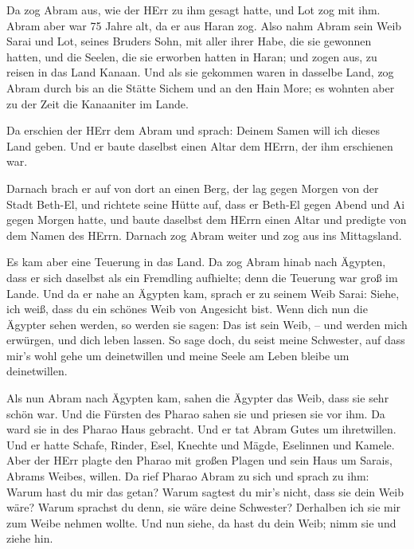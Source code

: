  Da zog Abram aus, wie der HErr zu ihm gesagt hatte, und Lot
zog mit ihm. Abram aber war 75 Jahre alt, da er aus Haran zog.
 Also nahm Abram sein Weib Sarai und Lot, seines Bruders
Sohn, mit aller ihrer Habe, die sie gewonnen hatten, und die Seelen, die
sie erworben hatten in Haran; und zogen aus, zu reisen in das Land
Kanaan. Und als sie gekommen waren in dasselbe Land,  zog
Abram durch bis an die Stätte Sichem und an den Hain More; es wohnten
aber zu der Zeit die Kanaaniter im Lande.

 Da erschien der HErr dem Abram und sprach: Deinem Samen
will ich dieses Land geben. Und er baute daselbst einen Altar dem HErrn,
der ihm erschienen war.

 Darnach brach er auf von dort an einen Berg, der lag gegen
Morgen von der Stadt Beth-El, und richtete seine Hütte auf, dass er
Beth-El gegen Abend und Ai gegen Morgen hatte, und baute daselbst dem
HErrn einen Altar und predigte von dem Namen des HErrn. 
Darnach zog Abram weiter und zog aus ins Mittagsland.

 Es kam aber eine Teuerung in das Land. Da zog Abram hinab
nach Ägypten, dass er sich daselbst als ein Fremdling aufhielte; denn
die Teuerung war groß im Lande.  Und da er nahe an Ägypten
kam, sprach er zu seinem Weib Sarai: Siehe, ich weiß, dass du ein
schönes Weib von Angesicht bist.  Wenn dich nun die Ägypter
sehen werden, so werden sie sagen: Das ist sein Weib, -- und werden mich
erwürgen, und dich leben lassen.  So sage doch, du seist
meine Schwester, auf dass mir's wohl gehe um deinetwillen und meine
Seele am Leben bleibe um deinetwillen.

 Als nun Abram nach Ägypten kam, sahen die Ägypter das
Weib, dass sie sehr schön war.  Und die Fürsten des Pharao
sahen sie und priesen sie vor ihm. Da ward sie in des Pharao Haus
gebracht.  Und er tat Abram Gutes um ihretwillen. Und er
hatte Schafe, Rinder, Esel, Knechte und Mägde, Eselinnen und Kamele.
 Aber der HErr plagte den Pharao mit großen Plagen und sein
Haus um Sarais, Abrams Weibes, willen.  Da rief Pharao
Abram zu sich und sprach zu ihm: Warum hast du mir das getan? Warum
sagtest du mir's nicht, dass sie dein Weib wäre?  Warum
sprachst du denn, sie wäre deine Schwester? Derhalben ich sie mir zum
Weibe nehmen wollte. Und nun siehe, da hast du dein Weib; nimm sie und
ziehe hin.

